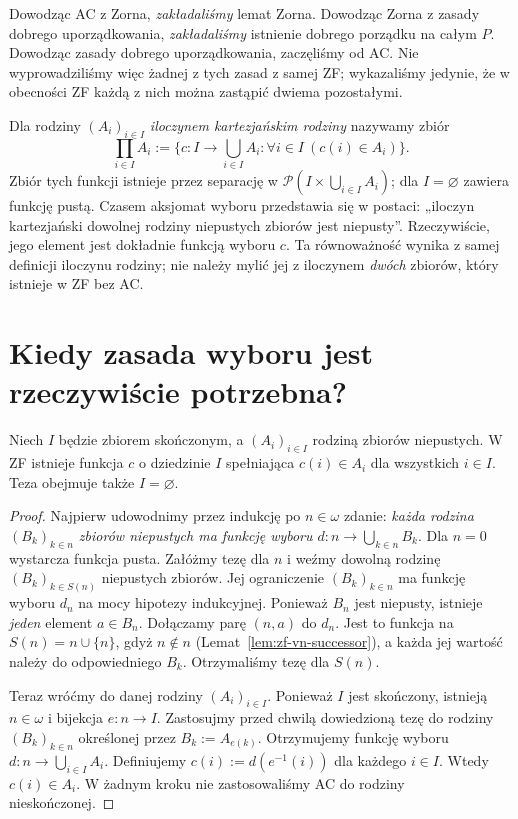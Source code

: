 \begin{uwaga}
Dowodząc AC z Zorna, \emph{zakładaliśmy} lemat Zorna.
Dowodząc Zorna z zasady dobrego uporządkowania,
\emph{zakładaliśmy} istnienie dobrego porządku na całym $P$.
Dowodząc zasady dobrego uporządkowania, zaczęliśmy
od AC. Nie wyprowadziliśmy więc żadnej z tych zasad
z samej ZF; wykazaliśmy jedynie, że w obecności ZF
każdą z nich można zastąpić dwiema pozostałymi.
\end{uwaga}

\begin{przyklad}
Dla rodziny $(A_i)_{i\in I}$ \emph{iloczynem kartezjańskim rodziny}
nazywamy zbiór
\[
\prod_{i\in I}A_i:=\{c:I\to\bigcup_{i\in I}A_i:
\forall i\in I\ (c(i)\in A_i)\}.
\]
Zbiór tych funkcji istnieje przez separację
w $\mathcal P(I\times\bigcup_{i\in I}A_i)$;
dla $I=\varnothing$ zawiera funkcję pustą.
Czasem aksjomat wyboru przedstawia się w postaci:
„iloczyn kartezjański dowolnej rodziny niepustych
zbiorów jest niepusty”. Rzeczywiście, jego element
jest dokładnie funkcją wyboru $c$.
Ta równoważność wynika z samej definicji iloczynu
rodziny; nie należy mylić jej z iloczynem
\emph{dwóch} zbiorów, który istnieje w ZF bez AC.
\end{przyklad}

\section{Kiedy zasada wyboru jest rzeczywiście potrzebna?}

\begin{twierdzenie}
\label{thm:choice-finite-family}
Niech $I$ będzie zbiorem skończonym,
a $(A_i)_{i\in I}$ rodziną zbiorów niepustych.
W ZF istnieje funkcja $c$ o dziedzinie $I$
spełniająca $c(i)\in A_i$ dla wszystkich $i\in I$.
Teza obejmuje także $I=\varnothing$.
\end{twierdzenie}
\begin{proof}
Najpierw udowodnimy przez indukcję po $n\in\omega$
zdanie: \emph{każda rodzina $(B_k)_{k\in n}$
zbiorów niepustych ma funkcję wyboru
$d:n\to\bigcup_{k\in n}B_k$}.
Dla $n=0$ wystarcza funkcja pusta.
Załóżmy tezę dla $n$ i weźmy dowolną rodzinę
$(B_k)_{k\in S(n)}$ niepustych zbiorów.
Jej ograniczenie $(B_k)_{k\in n}$ ma
funkcję wyboru $d_n$ na mocy hipotezy indukcyjnej.
Ponieważ $B_n$ jest niepusty,
istnieje \emph{jeden} element $a\in B_n$.
Dołączamy parę $(n,a)$ do $d_n$.
Jest to funkcja na $S(n)=n\cup\{n\}$,
gdyż $n\notin n$
(Lemat~\ref{lem:zf-vn-successor}),
a każda jej wartość należy do odpowiedniego $B_k$.
Otrzymaliśmy tezę dla $S(n)$.

Teraz wróćmy do danej rodziny $(A_i)_{i\in I}$.
Ponieważ $I$ jest skończony, istnieją
$n\in\omega$ i bijekcja $e:n\to I$.
Zastosujmy przed chwilą dowiedzioną tezę
do rodziny $(B_k)_{k\in n}$ określonej przez
$B_k:=A_{e(k)}$. Otrzymujemy funkcję wyboru
$d:n\to\bigcup_{i\in I}A_i$.
Definiujemy $c(i):=d(e^{-1}(i))$ dla każdego
$i\in I$. Wtedy $c(i)\in A_i$.
W żadnym kroku nie zastosowaliśmy AC
do rodziny nieskończonej.
\end{proof}

